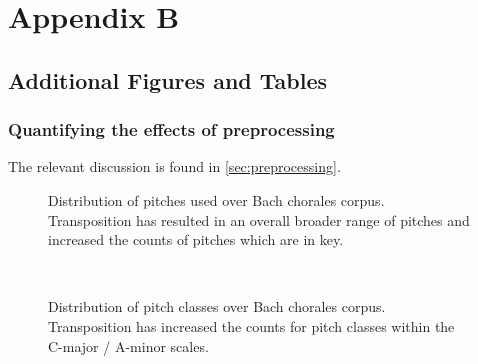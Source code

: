 \chapter{Appendix B}

\ifpdf
    \graphicspath{{Appendix2/Figs/Raster/}{Appendix2/Figs/PDF/}{Appendix2/Figs/}}
\else
    \graphicspath{{Appendix2/Figs/Vector/}{Appendix2/Figs/}}
\fi

\section{Additional Figures and Tables}

\subsection{Quantifying the effects of preprocessing}

The relevant discussion is found in \vref{sec:preprocessing}.

\begin{landscape}
  \begin{figure}[p]
    \centering
    \begin{subfigure}[c]{1.0\textwidth}
        \centering
        
    \end{subfigure}
    \begin{subfigure}[c]{1.0\textwidth}
        \centering
        
    \end{subfigure}
    \caption{Distribution of pitches used over Bach chorales corpus.
      Transposition has resulted in an overall broader range of pitches and
    increased the counts of pitches which are in key.}
    \label{fig:pitch-key-standardization}
  \end{figure}
\end{landscape}

\begin{figure}[htbp]
    \centering
    \begin{subfigure}[t]{0.48\textwidth}
        \centering
        
    \end{subfigure}
    ~
    \begin{subfigure}[t]{0.48\textwidth}
        \centering
        
    \end{subfigure}
    \caption{Distribution of pitch classes over Bach chorales corpus. Transposition has increased the counts
    for pitch classes within the C-major / A-minor scales.}
    \label{fig:pc-key-standardization}
\end{figure}

